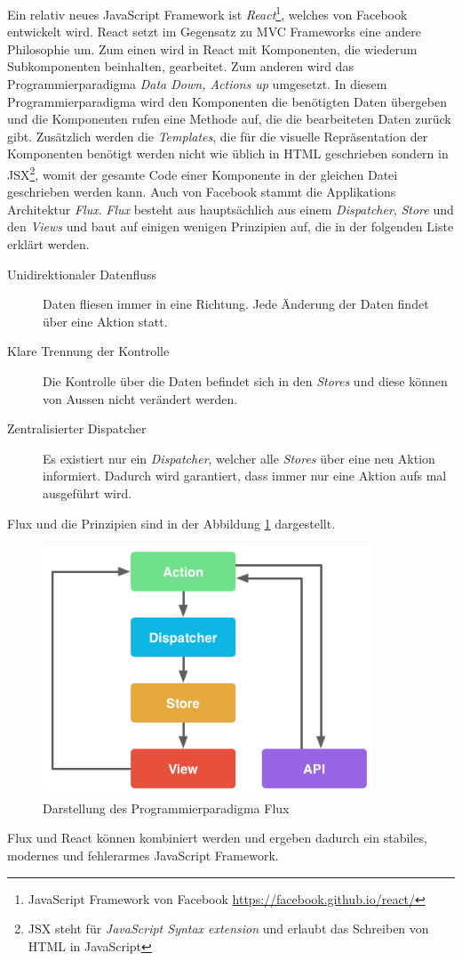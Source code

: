 \newline{}
Ein relativ neues JavaScript Framework ist \textit{React}\footnote{JavaScript Framework von Facebook \url{https://facebook.github.io/react/}}, welches von Facebook entwickelt wird. React setzt im Gegensatz zu MVC Frameworks eine andere Philosophie um. Zum einen wird in React mit Komponenten, die wiederum Subkomponenten beinhalten, gearbeitet. Zum anderen wird das Programmierparadigma \textit{Data Down, Actions up} umgesetzt. In diesem Programmierparadigma wird den Komponenten die benötigten Daten übergeben und die Komponenten rufen eine Methode auf, die die bearbeiteten Daten zurück gibt. Zusätzlich werden die \textit{Templates}, die für die visuelle Repräsentation der Komponenten benötigt werden nicht wie üblich in HTML geschrieben sondern in JSX\footnote{JSX steht für \textit{JavaScript Syntax extension} und erlaubt das Schreiben von HTML in JavaScript}, womit der gesamte Code einer Komponente in der gleichen Datei geschrieben werden kann. Auch von Facebook stammt die Applikations Architektur \textit{Flux}. \textit{Flux} besteht aus hauptsächlich aus einem \textit{Dispatcher}, \textit{Store} und den \textit{Views} und baut auf einigen wenigen Prinzipien auf, die in der folgenden Liste erklärt werden.
\begin{description}
	\item[Unidirektionaler Datenfluss] Daten fliesen immer in eine Richtung. Jede Änderung der Daten findet über eine Aktion statt.
	\item[Klare Trennung der Kontrolle] Die Kontrolle über die Daten befindet sich in den \textit{Stores} und diese können von Aussen nicht verändert werden.
	\item[Zentralisierter Dispatcher] Es existiert nur ein \textit{Dispatcher}, welcher alle \textit{Stores} über eine neu Aktion informiert. Dadurch wird garantiert, dass immer nur eine Aktion aufs mal ausgeführt wird.
\end{description}
Flux und die Prinzipien sind in der Abbildung \ref{fig:flux} dargestellt.

\begin{figure}[ht]
	\centering
  \includegraphics[width=0.88\textwidth]{images/flux.png}
	\caption{Darstellung des Programmierparadigma Flux}
	\label{fig:flux}
\end{figure}
Flux und React können kombiniert werden und ergeben dadurch ein stabiles, modernes und fehlerarmes JavaScript Framework.

